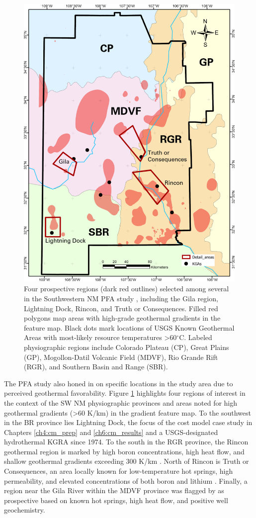 \begin{figure}
\centering
\includegraphics[width=.75\textwidth]{templates/images/Figure-PFA_Gradient_Labels.png}
\caption[SW NM PFA prospective areas]
{Four prospective regions (dark red outlines) selected among several in the Southwestern NM PFA study \protect\citep{bielicki_hydrogeolgic_2015}, including the Gila region, Lightning Dock, Rincon, and Truth or Consequences. Filled red polygons map areas with high-grade geothermal gradients in the \citeauthor{bielicki_hydrogeolgic_2015} feature map. Black dots mark locations of USGS Known Geothermal Areas with most-likely resource temperatures >60$^\circ$C. Labeled physiographic regions include Colorado Plateau (CP), Great Plains (GP), Mogollon-Datil Volcanic Field (MDVF), Rio Grande Rift (RGR), and Southern Basin and Range (SBR).}
\label{fig:pfa_prospects}
\end{figure}

The PFA study also honed in on specific locations in the study area due to perceived geothermal favorability. Figure \ref{fig:pfa_prospects} highlights four regions of interest in the context of the SW NM physiographic provinces and areas noted for high geothermal gradients (>60 K/km) in the \citeauthor{bielicki_hydrogeolgic_2015} gradient feature map. To the southwest in the BR province lies Lightning Dock, the focus of the cost model case study in Chapters \ref{ch4:cm_prep} and \ref{ch6:cm_results} and a USGS-designated hydrothermal KGRA since 1974. To the south in the RGR province, the Rincon geothermal region is marked by high boron concentrations, high heat flow, and shallow geothermal gradients exceeding 300 K/km \citep{witcher_deep_2002}. North of Rincon is Truth or Consequences, an area locally known for low-temperature hot springs, high permeability, and elevated concentrations of both boron and lithium \citep{pepin_deep_2015}. Finally, a region near the Gila River within the MDVF province was flagged by \citet{bielicki_hydrogeolgic_2015} as prospective based on known hot springs, high heat flow, and positive well geochemistry.

